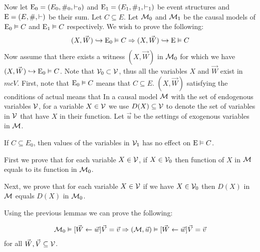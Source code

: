 \noindent Now let $\mathrm{E}_0 = (E_0,\#_0,\vdash_0)$ and
$\mathrm{E}_1 = (E_1,\#_1,\vdash_1)$ be event structures and
$\mathrm{E} = (E,\#,\vdash)$ be their sum.
Let $C \subseteq E$.
Let $\mathcal{M}_0$ and $\mathcal{M}_1$ be the causal models of
$\mathrm{E}_0 \vDash C$ and $\mathrm{E}_1 \vDash C$ respectively.
We wish to prove the following:
\begin{align*}
    (X,\vec W) \hookrightarrow \mathrm{E}_0 \vDash C
    \Rightarrow (X,\vec W) \hookrightarrow \mathrm{E} \vDash C
\end{align*}
Now assume that there exists a witness $(X,\vec W)$ in $\mathcal{M}_0$ for
which we have $(X,\vec W) \hookrightarrow \mathrm{E}_0 \vDash C$.
Note that $\mathcal{V}_0 \subset \mathcal{V}$, thus all the variables $X$ and
$\vec W$ exist in $mc{V}$.
First, note that $\mathrm{E}_0 \vDash C$ means that $C \subseteq E$.
$(X,\vec W)$ satisfying the conditions of actual means that
In a causal model $\mathcal{M}$ with the set of endogenous variables
$\mathcal{V}$, for a variable $X \in \mathcal{V}$ we use $D(X) \subseteq \mathcal{V}$
to denote the set of variables in $\mathcal{V}$ that have $X$ in their function.
Let $\vec u$ be the settings of exogenous variables in $\mathcal{M}$.
\begin{lemma}
    If $C \subseteq E_0$, then values of the variables in $\mathcal{V}_1$ has
    no effect on $\mathrm{E} \vDash C$.
\end{lemma}
\begin{lemma}
First we prove that for each variable $X \in \mathcal{V}$, if $X \in \mathcal{V}_0$
then function of $X$ in $\mathcal{M}$ equals to its function in $\mathcal{M}_0$.
\end{lemma}
\begin{lemma}
Next, we prove that for each variable $X \in \mathcal{V}$ if we have
$X \in \mathcal{V}_0$ then $D(X)$ in $\mathcal{M}$ equals $D(X)$ in $\mathcal{M}_0$.
\end{lemma}
Using the previous lemmas we can prove the following:

\begin{align*}
    \mathcal{M}_0 \vDash [\vec W \leftarrow \vec w]\vec V = \vec v
    \Rightarrow (\mathcal{M},\vec u) \vDash [\vec W \leftarrow \vec w] \vec V = \vec v
\end{align*}
for all $\vec W, \vec V \subseteq \mathcal{V}$.
